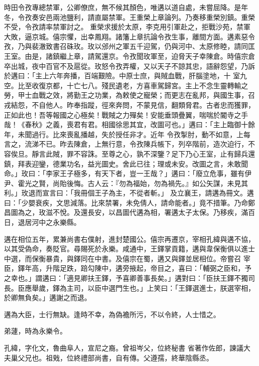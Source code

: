 \begin{pinyinscope}
 時田令孜專總禁軍，公卿僚庶，無不候其顏色，唯遘以道自處，未嘗屈降。是年冬，令孜奏安邑兩池鹽利，請直屬禁軍。王重榮上章論列。乃奏移重榮別鎮。重榮不受，令孜請率禁軍討之。
 重榮求援於太原，李克用引軍赴之，拒戰沙苑，禁軍大敗，逼京城。僖宗懼，出幸鳳翔。諸籓上章抗論令孜生事，離間方面。遘素惡令孜，乃與裴澈致書召硃玫。玫以邠州之軍五千迎駕，仍與河中、太原修睦，請同匡王室。由是，諸鎮繼上章，請駕還京。令孜聞玫軍至，迫脅天子幸陳倉。時僖宗倉卒出城，夜中百官不及扈從。玫怒令孜弄權，又以天子不諒其忠，語辭怨望，乃訴於遘曰：「主上六年奔播，百端艱險。中原士庶，與賊血戰，肝腦塗地，十
 室九空。比至收復京都，十亡七八。殘民遺老，方喜車駕歸宮。主上不念生靈轉輸之勞，甲士血戰之效，將勤王之功業，為敕使之寵榮；而更志在亂邦，與國生事，召戎結怨，不自他人。昨奉指蹤，徑來奔問，不蒙見信，翻類脅君。古者忠而獲罪，正如此也！吾等報國之心極矣！戰賊之力殫矣！安能垂頭疊翼，喘喘於閽寺之手哉！《春秋》之義，喪君有君。相國徐思其宜，改圖可也。」遘曰：「主上臨御十餘年，未聞過行。比來喪亂播越，失於授任非才。近年
 令孜掣肘，動不如意，上每言之，流涕不已。昨去陳倉，上無行意，令孜陳兵帳下，列卒階前，造次迫行，不容俟旦。靜言此賊，罪不容誅。至尊之心，孰不深鑒？足下乃心王室，止有歸兵還鎮，拜表迎鑾，德業功名，益光圖史。舍此已往；理或未安。改圖之言，未敢聞命。」玫曰：「李家王子極多，有天下者，豈一王哉？」遘曰：「廢立危事，雖有伊尹、霍光之賢，尚貽後悔。古人云：『勿為福始，勿為禍先。』如公矢謀，未見其利。」玫退而宣言曰：「我冊個王子為主，不從者斬。」
 及立襄王，請遘為冊文。遘曰：「少嬰衰疾，文思減落。比來禁署，未免倩人，請命能者。」竟不措筆。乃命鄭昌圖為之，玫滋不悅。及還長安，以昌圖代遘為相，署遘太子太保。乃移疾，滿百日，退居河中之永樂縣。



 遘在相位五年，累兼尚書右僕射，進封楚國公。僖宗再遷京，宰相孔緯與遘不協，以其受偽命，奏貶官。尋賜死於永樂。咸通中，王鐸掌貢籍，遘與韋保衡俱以進士中選，而保衡暴貴，與鐸同在中書。及僖宗在蜀，遘又與鐸並居相位。帝嘗召
 宰臣，鐸年高，升階足跌，踣勾陳中，遘旁掖起，帝目之，喜曰：「輔弼之臣和，予之幸也。」謂遘曰：「適見卿扶王鐸，予喜卿善事長矣。」遘對曰：「臣扶王鐸不獨司長。臣應舉歲，鐸為主司，以臣中選門生也。」上笑曰：「王鐸選進士，朕選宰相，於卿無負矣。」遘謝之而退。



 遘為大臣，士行無缺。逢時不幸，為偽襜所污，不以令終，人士惜之。



 弟蘧，時為永樂令。



 孔緯，字化文，魯曲阜人，宣尼之裔。曾祖岑父，位終秘書
 省著作佐郎，諫議大夫巢父兄也。祖戣，位終禮部尚書，自有傳。父遵孺，終華陰縣丞。




\end{pinyinscope}
